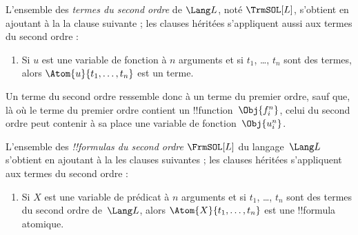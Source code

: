 \documentclass[../../../include/open-logic-section]{subfiles}
\begin{document}
\begin{defn}
L'ensemble des \emph{termes du second ordre} de
$\Lang L$, noté $\TrmSOL[L]$, s'obtient en
ajoutant à la 
la clause suivante ; les clauses héritées s’appliquent aussi aux termes du second ordre :
\begin{enumerate}
\item Si $u$ est une variable de fonction à
  $n$ arguments et si $t_1$, \dots, $t_n$ sont
  des termes, alors $\Atom{u}{t_1,\ldots,t_n}$
  est un terme.
\end{enumerate}
\end{defn}

\begin{explain}
Un terme du second ordre ressemble donc à un
terme du premier ordre, sauf que, là où le terme
du premier ordre contient un
!!{function}~$\Obj{f^n_i}$, celui du second ordre
peut contenir à sa place une variable de
fonction~$\Obj{u^n_i}$.
\end{explain}

\begin{defn}
L'ensemble des \emph{!!{formula}s du second ordre}
$\FrmSOL[L]$ du langage~$\Lang L$ s'obtient en
ajoutant à la 
les clauses suivantes ; les clauses héritées s’appliquent aux termes du second ordre :
\begin{enumerate}
\item Si $X$ est une variable de prédicat à
  $n$ arguments et si $t_1$, \dots, $t_n$ sont
  des termes du second ordre de~$\Lang L$, alors
  $\Atom{X}{t_1,\ldots,t_n}$ est une
  !!{formula} atomique.




\end{enumerate}
\end{defn}
\end{document}
